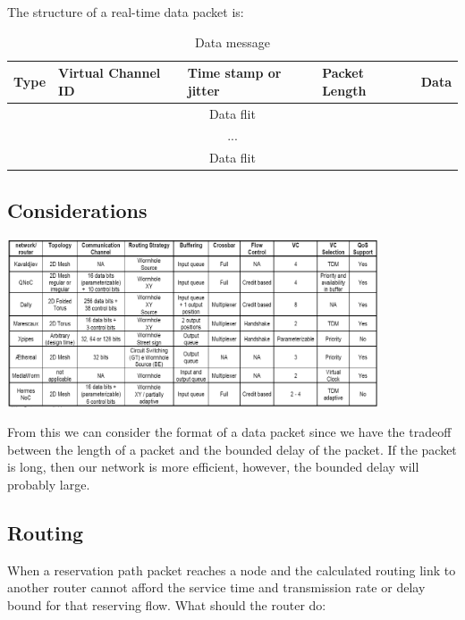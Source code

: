 \documentclass[10pt]{article}
\begin{document}
The structure of a real-time data packet is:

\begin{table}[h]
\begin{center}
  \begin{tabular}{ | l | l | l | l | l |}
    \hline
	Type & Virtual Channel ID & Time stamp or jitter & Packet Length & Data \\ \hline
	\multicolumn{5}{|c|}{Data flit} \\ \hline
	\multicolumn{5}{|c|}{...} \\ \hline
	\multicolumn{5}{|c|}{Data flit} \\
    \hline
  \end{tabular}
\end{center}
\caption{Data message}
\label{table:DataMsg}
\end{table}

\subsection{Considerations}
\includegraphics[width=11cm]{pics/OtherArcs.png}

From this we can consider the format of a data packet since we have the 
tradeoff between the length of a packet and the bounded delay of the packet. 
If the packet is long, then our network is more efficient, however, the bounded 
delay will probably large.
\subsection{Routing}
When a reservation path packet reaches a node and the calculated routing link 
to another router cannot afford the service time and transmission rate or delay 
bound for that reserving flow. What should the router do:
\end{document}
